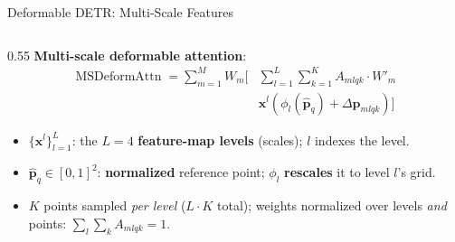 \begin{frame}{Deformable DETR: Multi-Scale Features}

  \begin{columns}
    \begin{column}{0.55\textwidth}
      \textbf{Multi-scale deformable attention}:
      \begin{align*}
        \operatorname{MSDeformAttn} = \sum_{m=1}^{M} W_m \biggl[ & \sum_{l=1}^{L}\sum_{k=1}^{K} A_{mlqk} \cdot W'_m \, \\
        & \mathbf{x}^l(\phi_l(\hat{\mathbf{p}}_q) + \Delta\mathbf{p}_{mlqk})\biggr]
      \end{align*}
      \begin{itemize}
        \item $\{\mathbf{x}^l\}_{l=1}^{L}$: the $L{=}4$ \textbf{feature-map levels} (scales); $l$ indexes the level.
        \item $\hat{\mathbf{p}}_q\in[0,1]^2$: \textbf{normalized} reference point; $\phi_l$ \textbf{rescales} it to level $l$'s grid.
        \item $K$ points sampled \emph{per level} ($L{\cdot}K$ total); weights normalized over levels \emph{and} points: $\sum_l\sum_k A_{mlqk}{=}1$.
      \end{itemize}


\end{column}
\end{columns}
\end{frame}
